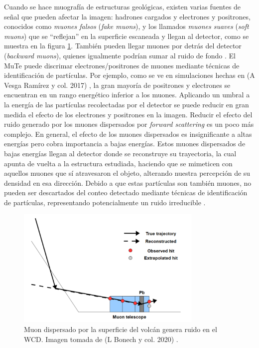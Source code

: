 \documentclass[12pt]{report}
\begin{document}
Cuando se hace muografía de estructuras geológicas, existen varias fuentes de señal que pueden afectar la imagen: hadrones cargados y electrones y positrones, conocidos como \textit{muones falsos} (\textit{fake muons}), y los llamados \textit{muones suaves} (\textit{soft muons}) que se ``reflejan'' en la superficie escaneada y llegan al detector, como se muestra en la figura \ref{fig:scatteredNoise}. También pueden llegar muones por detrás del detector (\textit{backward muons}), quienes igualmente podrían sumar al ruido de fondo \cite{bonechi2020atmospheric}. El MuTe puede discrimar electrones/positrones de muones mediante técnicas de identificación de partículas. Por ejemplo, como se ve en simulaciones hechas en (A Vesga Ramírez y col. 2017) \cite{asorey2017muon}, la gran mayoría de positrones y electrones se encuentran en un rango energético inferior a los muones. Aplicando un umbral a la energía de las partículas recolectadas por el detector se puede reducir en gran medida el efecto de los electrones y positrones en la imagen. Reducir el efecto del ruido generado por los muones dispersados por \textit{forward scattering} es un poco más complejo. En general, el efecto de los muones dispersados es insignificante a altas energías pero cobra importancia a bajas energías. Estos muones dispersados de bajas energías llegan al detector donde se reconstruye su trayectoria, la cual apunta de vuelta a la estructura estudiada, haciendo que se mimeticen con aquellos muones que sí atravesaron el objeto, alterando nuestra percepción de su densidad en esa dirección. Debido a que estas partículas son también muones, no pueden ser descartados del conteo detectado mediante técnicas de identificación de partículas, representando potencialmente un ruido irreducible \cite{gomez2017forward}.

\begin{figure}
    \centering
    \includegraphics[width=3.5in]{images/scatteredNoiseV2.png}
    \caption{Muon dispersado por la superficie del volcán genera ruido en el WCD. Imagen tomada de (L Bonech y col. 2020) \cite{bonechi2020atmospheric}.}
    \label{fig:scatteredNoise}
\end{figure}
\end{document}
